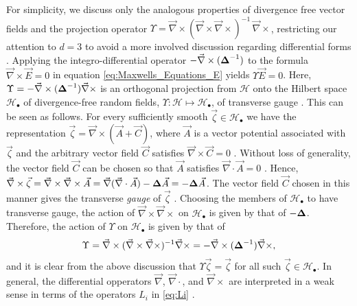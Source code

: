 \documentclass{cmslatex}
\newcommand\bDelta{\mbox{\boldmath${\Delta}$}}
\begin{document}
For simplicity, we discuss only the analogous properties of divergence
free vector fields and the projection operator
$\Upsilon=\vec{\nabla}\times(\vec{\nabla}\times\vec{\nabla}\times)^{-1}\,\vec{\nabla}\times$, restricting our
attention to $d=3$ to avoid a more involved discussion regarding
differential forms \cite{Darling:Differential_Forms:1994}.
Applying the integro-differential
operator $-\vec{\nabla}\times(\bDelta^{-1})$ to the formula
$\vec{\nabla}\times\vec{E}=0$ in equation \eqref{eq:Maxwells_Equations_E} yields  
$\Upsilon\vec{E}=0$. Here, $\Upsilon=-\vec{\nabla}\times(\bDelta^{-1})\vec{\nabla}\times$ is an
orthogonal projection from $\mathscr{H}$ onto the Hilbert space 
$\mathscr{H}_{\bullet}$ of divergence-free random fields,
$\Upsilon:\mathscr{H}\mapsto\mathscr{H}_\bullet$, of transverse gauge
\cite{Murphy:JMP:063506}. This can be seen as follows. For every
sufficiently smooth $\vec{\zeta}\in\mathscr{H}_\bullet$ we have the representation
$\vec{\zeta}=\vec{\nabla}\times(\vec{A}+\vec{C})$, where $\vec{A}$ is a vector
potential associated with $\vec{\zeta}$ and the arbitrary vector field
$\vec{C}$ satisfies $\vec{\nabla}\times\vec{C}=0$ \cite{Jackson-1999}. Without
loss of generality, the vector field $\vec{C}$ can be chosen so that
$\vec{A}$ satisfies $\vec{\nabla}\cdot\vec{A}=0$ \cite{Jackson-1999}. Hence,
$\vec{\nabla}\times\vec{\zeta}=\vec{\nabla}\times\vec{\nabla}\times\vec{A}
=\vec{\nabla}(\vec{\nabla}\cdot\vec{A})-\bDelta\vec{A}=-\bDelta\vec{A}$. The vector field
$\vec{C}$ chosen in this manner gives the transverse \emph{gauge} of
$\vec{\zeta}$ \cite{Jackson-1999}. Choosing the members of 
$\mathscr{H}_\bullet$ to have transverse gauge, the action of
$\vec{\nabla}\times\vec{\nabla}\times$ on $\mathscr{H}_\bullet$ is given by that of
$-\bDelta$. Therefore, the action of $\Upsilon$ on $\mathscr{H}_\bullet$ is given
by that of 
%
\begin{align}\label{eq:GammaCurl}
  \Upsilon=\vec{\nabla}\times(\vec{\nabla}\times\vec{\nabla}\times)^{-1}\vec{\nabla}\times
  =-\vec{\nabla}\times(\bDelta^{-1})\vec{\nabla}\times, 
\end{align}
%
and it is clear from the above discussion that $\Upsilon\vec{\zeta}=\vec{\zeta}$ for
all such $\vec{\zeta}\in\mathscr{H}_\bullet$. In general, the differential
opperators $\vec{\nabla}$, $\vec{\nabla}\cdot$, and $\vec{\nabla}\times$ are interpreted
in a weak sense in terms of the operators $L_i$ in \eqref{eq:Li}
\cite{Golden:CMP-473}. 
\end{document}
